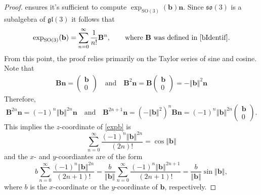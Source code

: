 \documentclass[a4paper,11pt]{scrartcl}
\numberwithin{dummy}{section}
\theoremstyle{plain}
\theoremstyle{plain}
\theoremstyle{plain}
\theoremstyle{plain}
\theoremstyle{nonumberplain}
\newtheorem{proof}{Proof}
\newcommand{\Ltwonorm}[1]{\left\Vert #1 \right\Vert} %
\newcommand{\SO}{\mathrm{SO}}
\begin{document}
	\begin{proof}
		 ensures it's sufficient to compute $ \exp_{\SO(3)} (\mathbf{b}) \mathbf{n}  $.
		Since $ \mathfrak{so}(3) $ is a subalgebra of $ \mathfrak{gl} (3) $ it follows that
		\begin{equation}
		\label{expb}
		\exp_{\SO(3)} (\mathbf{b})
		= \sum_{n=0}^{\infty} \frac{1}{n!} \mathbf{B}^{n}, 
		\qquad \mbox{where $ \mathbf{B} $  was defined in \eqref{bIdentif}.}
		\end{equation}
		From this point, the proof relies primarily on the Taylor series of sine and cosine.
		Note that
		\begin{align*}
		\mathbf{B} \mathbf{n} 
		= \left(\begin{matrix}
		\mathbf{b} \\ 0
		\end{matrix}\right) 
		\quad\mbox{and}\quad
		\mathbf{B}^{2} \mathbf{n}
		= \mathbf{B} 
		\left(\begin{matrix}
		\mathbf{b} \\ 0
		\end{matrix}\right)
		= - \Ltwonorm{\mathbf{b}}^{2} \mathbf{n}
		\end{align*}
		Therefore,
		\begin{equation*}
		\mathbf{B}^{2n} \mathbf{n} 
		= (- 1)^{n} \Ltwonorm{\mathbf{b}}^{2n} \mathbf{n}
		\quad \mbox{and} \quad
		\mathbf{B}^{2n+1} \mathbf{n} 
		= \left( - \Ltwonorm{\mathbf{b}}^{2}\right)^{n} \mathbf{B} \mathbf{n}
		= (-1)^{n} \Ltwonorm{\mathbf{b}}^{2n}
		\left(\begin{matrix}
		\mathbf{b} \\ 0
		\end{matrix}\right).
		\end{equation*}
		This implies the $ z $-coordinate of \eqref{expb} is
		\begin{equation*}
		\sum_{n=0}^{\infty} \frac{ (-1)^{n} \Ltwonorm{\mathbf{b}}^{2n} }{(2n)!}
		= \cos \Ltwonorm{\mathbf{b}}
		\end{equation*}
		and the $ x $- and $ y $-coordiantes are of the form
		\begin{equation*}
		b \sum_{n=0}^{\infty} \frac{(-1)^{n} \Ltwonorm{\mathbf{b}}^{2n}}{(2n+1)!}
		= \frac{b}{\Ltwonorm{\mathbf{b}}} \sum_{n=0}^{\infty} \frac{(-1)^{n} \Ltwonorm{\mathbf{b}}^{2n+1}}{(2n+1)!}
		= \frac{b}{\Ltwonorm{\mathbf{b}}} \sin \Ltwonorm{\mathbf{b}},
		\end{equation*}
		where $ b $ is the $ x $-coordinate or the $ y $-coordinate of $ \mathbf{b} $, respectively.
	\end{proof}
	
\end{document}
